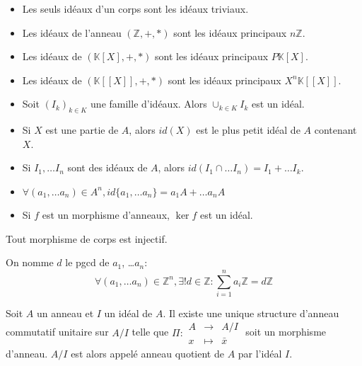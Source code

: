 \begin{prop}\begin{itemize}
    \item Les seuls idéaux d'un corps sont les idéaux triviaux.
    \item Les idéaux de l'anneau $(\mathbb{Z}, +, *)$ sont les idéaux principaux $n\mathbb{Z}$.
    \item Les idéaux de $(\mathbb{K}[X], +, *)$ sont les idéaux principaux $P\mathbb{K}[X]$.
    \item Les idéaux de $(\mathbb{K}[[X]], +, *)$ sont les idéaux principaux $X^n\mathbb{K}[[X]]$.
\end{itemize}\end{prop}

\begin{prop}\begin{itemize}
    \item Soit $(I_k)_{k\in K}$ une famille d'idéaux. Alors $\cup_{k\in K} I_k$ est un idéal.
    \item Si $X$ est une partie de $A$, alors $id(X)$ est le plus petit idéal de $A$ contenant $X$.
    \item Si $I_1, \ldots I_n$ sont des idéaux de $A$, alors $id(I_1 \cap \ldots I_n) = I_1 + \ldots I_k$.
    \item $\forall (a_1, \ldots a_n)\in A^n, id\{a_1, \ldots a_n\} = a_1A + \ldots a_nA$
    \item Si $f$ est un morphisme d'anneaux, $\ker f$ est un idéal.
\end{itemize}\end{prop}

\begin{rem} Tout morphisme de corps est injectif.
\end{rem}

\begin{prop} On nomme $d$ le pgcd de $a_1$, \ldots $a_n$:
    \[\forall (a_1, \ldots a_n)\in\mathbb{Z}^n, \exists ! d\in\mathbb{Z}: \sum_{i=1}^na_i\mathbb{Z} = d\mathbb{Z}\]
\end{prop}

\begin{prop} Soit $A$ un anneau et $I$ un idéal de $A$. Il existe une unique structure d'anneau commutatif unitaire sur $A/I$ telle que $\Pi : \begin{array}{ccc} A & \rightarrow & A/I \\ x & \mapsto & \bar{x} \end{array}$ soit un morphisme d'anneau. $A/I$ est alors appelé anneau quotient de $A$ par l'idéal $I$.
\end{prop}

